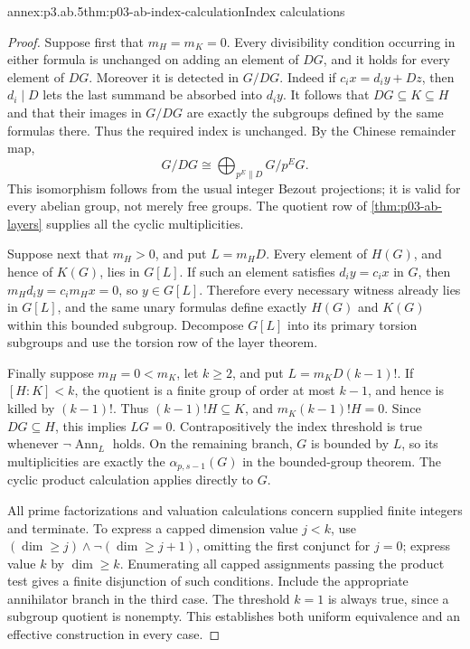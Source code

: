 \begin{annexitem}{annex:p3.ab.5}{thm:p03-ab-index-calculation}{Index calculations}
\begin{proof}
Suppose first that \(m_H=m_K=0\). Every divisibility condition occurring
in either formula is unchanged on adding an element of \(DG\), and it
holds for every element of \(DG\). Moreover it is detected in \(G/DG\).
Indeed if \(c_ix=d_iy+D z\), then \(d_i\mid D\) lets the last summand
be absorbed into \(d_iy\). It follows that \(DG\subseteq K\subseteq H\)
and that their images in \(G/DG\) are exactly the subgroups defined by
the same formulas there. Thus the required index is unchanged. By the
Chinese remainder map,
\[
 G/DG\cong\bigoplus_{p^E\parallel D}G/p^EG.
\]
This isomorphism follows from the usual integer Bezout projections; it
is valid for every abelian group, not merely free groups. The quotient
row of \cref{thm:p03-ab-layers} supplies all the cyclic multiplicities.

Suppose next that \(m_H>0\), and put \(L=m_HD\). Every element of
\(H(G)\), and hence of \(K(G)\), lies in \(G[L]\). If such an element
satisfies \(d_i y=c_i x\) in \(G\), then
\(m_Hd_i y=c_i m_Hx=0\), so \(y\in G[L]\). Therefore every necessary
witness already lies in \(G[L]\), and the same unary formulas define
exactly \(H(G)\) and \(K(G)\) within this bounded subgroup. Decompose
\(G[L]\) into its primary torsion subgroups and use the torsion row
of the layer theorem.

Finally suppose \(m_H=0<m_K\), let \(k\geq2\), and put
\(L=m_KD(k-1)!\). If \([H:K]<k\), the quotient is a finite group of
order at most \(k-1\), and hence is killed by \((k-1)!\). Thus
\((k-1)!H\subseteq K\), and \(m_K(k-1)!H=0\). Since \(DG\subseteq H\),
this implies \(LG=0\). Contrapositively the index threshold is true
whenever \(\neg\operatorname{Ann}_L\) holds. On the remaining branch,
\(G\) is bounded by \(L\), so its multiplicities are exactly the
\(\alpha_{p,s-1}(G)\) in the bounded-group theorem. The cyclic product
calculation applies directly to \(G\).

All prime factorizations and valuation calculations concern supplied
finite integers and terminate. To express a capped dimension value
\(j<k\), use \((\dim\geq j)\land\neg(\dim\geq j+1)\), omitting the
first conjunct for \(j=0\); express value \(k\) by \(\dim\geq k\).
Enumerating all capped assignments passing the product test gives a
finite disjunction of such conditions. Include the appropriate
annihilator branch in the third case. The threshold \(k=1\) is always
true, since a subgroup quotient is nonempty. This establishes both
uniform equivalence and an effective construction in every case.
\end{proof}
\end{annexitem}

